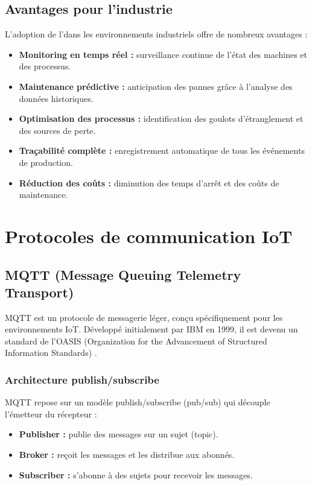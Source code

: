 \subsection{Avantages pour l'industrie}

L'adoption de l'\iiot dans les environnements industriels offre de nombreux avantages :

\begin{itemize}
    \item \textbf{Monitoring en temps r\'eel :} surveillance continue de l'\'etat des machines et des processus.
    \item \textbf{Maintenance pr\'edictive :} anticipation des pannes gr\^ace \`a l'analyse des donn\'ees historiques.
    \item \textbf{Optimisation des processus :} identification des goulots d'\'etranglement et des sources de perte.
    \item \textbf{Tra\c{c}abilit\'e compl\`ete :} enregistrement automatique de tous les \'ev\'enements de production.
    \item \textbf{R\'eduction des co\^uts :} diminution des temps d'arr\^et et des co\^uts de maintenance.
\end{itemize}

\section{Protocoles de communication IoT}

\subsection{MQTT (Message Queuing Telemetry Transport)}

MQTT est un protocole de messagerie l\'eger, con\c{c}u sp\'ecifiquement pour les environnements IoT. D\'evelopp\'e initialement par IBM en 1999, il est devenu un standard de l'OASIS (Organization for the Advancement of Structured Information Standards) \cite{banks2014mqtt}.

\subsubsection{Architecture publish/subscribe}

MQTT repose sur un mod\`ele publish/subscribe (pub/sub) qui d\'ecouple l'\'emetteur du r\'ecepteur :

\begin{itemize}
    \item \textbf{Publisher :} publie des messages sur un sujet (topic).
    \item \textbf{Broker :} re\c{c}oit les messages et les distribue aux abonn\'es.
    \item \textbf{Subscriber :} s'abonne \`a des sujets pour recevoir les messages.
\end{itemize}

